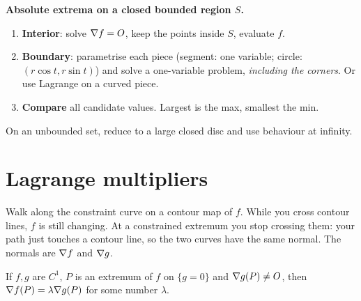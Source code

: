 \begin{method}
\textbf{Absolute extrema on a closed bounded region $S$.}
\begin{enumerate}
  \item \textbf{Interior}: solve $\nabla f=O$, keep the points inside $S$, evaluate $f$.
  \item \textbf{Boundary}: parametrise each piece (segment: one variable; circle:
  $(r\cos t,r\sin t)$) and solve a one-variable problem, \emph{including the corners}. Or use
  Lagrange on a curved piece.
  \item \textbf{Compare} all candidate values. Largest is the max, smallest the min.
\end{enumerate}
On an unbounded set, reduce to a large closed disc and use behaviour at infinity.
\end{method}

\section{Lagrange multipliers}

\begin{intuition}
Walk along the constraint curve on a contour map of $f$. While you cross contour lines, $f$ is
still changing. At a constrained extremum you stop crossing them: your path just touches a
contour line, so the two curves have the same normal. The normals are $\nabla f$ and $\nabla g$.
\end{intuition}

\begin{thm}[Lagrange]
If $f,g$ are $C^1$, $P$ is an extremum of $f$ on $\{g=0\}$ and $\nabla g(P)\ne O$, then
$\nabla f(P)=\lambda\nabla g(P)$ for some number $\lambda$.
\end{thm}

\begin{center}
\end{center}

